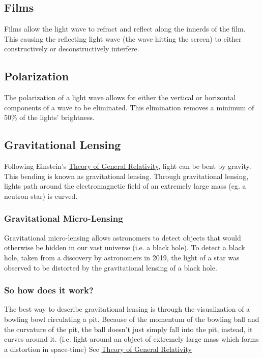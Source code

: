 \documentclass{article}
\begin{document}
\subsection{Films}
Films allow the light wave to refract and reflect along the innerds of the film. This causing the reflecting light wave (the wave hitting the screen) to either constructively or deconstructively interfere.

\subsection{Polarization}
The polarization of a light wave allows for either the vertical or horizontal components of a wave to be eliminated. This elimination removes a minimum of $50\%$ of the lights' brightness.

\subsection{Gravitational Lensing}\label{sec:gravitational_lensing}
Following Einstein's \hyperref[sec:generalrelativity]{Theory of General Relativity}, light can be bent by gravity. This bending is known as gravitational lensing. Through gravitational lensing, lights path around the electromagnetic field of an extremely large mass (eg. a neutron star) is curved.

\subsubsection{Gravitational Micro-Lensing}
Gravitational micro-lensing allows astronomers to detect objects that would otherwise be hidden in our vast universe (i.e. a black hole). To detect a black hole, taken from a discovery by astronomers in 2019, the light of a star was observed to be distorted by the gravitational lensing of a black hole.

\subsubsection{So how does it work?}
The best way to describe gravitational lensing is through the visualization of a bowling bowl circulating a pit. Because of the momentum of the bowling ball and the curvature of the pit, the ball doesn't just simply fall into the pit, instead, it curves around it. (i.e. light around an object of extremely large mass which forms a distortion in space-time) See \hyperref[sec:generalrelativity]{Theory of General Relativity}
\end{document}
